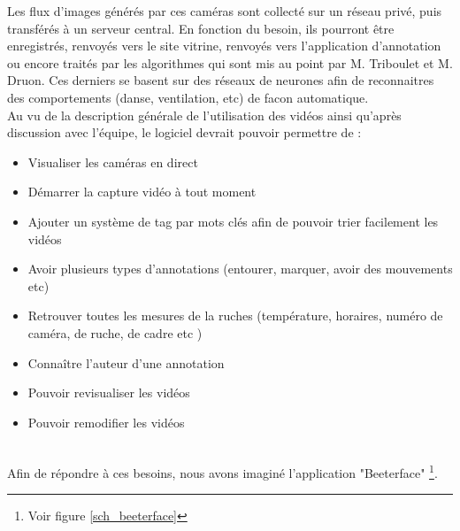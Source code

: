 \documentclass[11pt,french,a4paper]{report}
\begin{document}
  Les flux d'images générés par ces caméras sont collecté sur un réseau privé,
  puis transférés à un serveur central. En fonction du besoin, ils pourront
  être enregistrés, renvoyés vers le site vitrine, renvoyés vers l'application d'annotation
  ou encore traités par les algorithmes qui sont mis au point par M. Triboulet et M. Druon. 
  Ces derniers se basent sur des réseaux de neurones afin de reconnaitres des comportements
  (danse, ventilation, etc) de facon automatique. \\

Au vu de la description générale de l'utilisation des vidéos ainsi qu'après discussion avec l'équipe, le logiciel devrait 
pouvoir permettre de : \\
\begin{itemize}[itemsep=0cm,topsep=0cm]
    \item Visualiser les caméras en direct
    \item Démarrer la capture vidéo à tout moment 
    \item Ajouter un système de tag par mots clés afin de pouvoir trier facilement les vidéos 
    \item Avoir plusieurs types d'annotations (entourer, marquer, avoir des mouvements etc) 
    \item Retrouver toutes les mesures de la ruches (température, horaires, numéro de caméra, de ruche, de cadre etc )  
    \item Connaître l'auteur d'une annotation 
    \item Pouvoir revisualiser les vidéos 
    \item Pouvoir remodifier les vidéos 
\end{itemize} \\
Afin de répondre à ces besoins, nous avons imaginé l'application "Beeterface" \footnote{Voir figure \ref{sch_beeterface}}.
\end{document}
